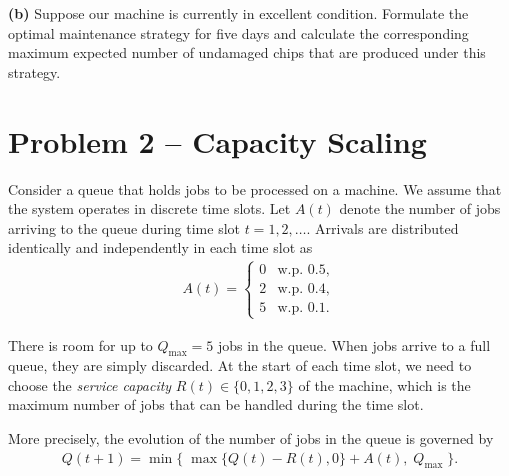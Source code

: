 \documentclass{article}
\begin{document}
\vspace{1em}
\noindent
\textbf{(b)}
Suppose our machine is currently in excellent condition.
Formulate the optimal maintenance strategy for five days and calculate the corresponding maximum expected number of undamaged chips that are produced under this strategy.


\section*{Problem 2 -- Capacity Scaling}

Consider a queue that holds jobs to be processed on a machine.
We assume that the system operates in discrete time slots.
Let $A(t)$ denote the number of jobs arriving to the queue during time slot $t = 1, 2, \dots$.
Arrivals are distributed identically and independently in each time slot as
\begin{align*}
    A(t) = \begin{cases}
        0 & \text{w.p. } 0.5, \\
        2 & \text{w.p. } 0.4, \\
        5 & \text{w.p. } 0.1.
    \end{cases}
\end{align*}


\noindent
There is room for up to $Q_\text{max}=5$ jobs in the queue.
When jobs arrive to a full queue, they are simply discarded.
At the start of each time slot, we need to choose the \textit{service capacity} $R(t) \in \{ 0, 1, 2, 3 \}$ of the machine, which is the maximum number of jobs that can be handled during the time slot.

\begin{figure}[h!]
    \centering
{}
\label{queue}
\end{figure}
\vspace{0.5em}

\noindent
More precisely, the evolution of the number of jobs in the queue is governed by
\begin{align*}
    Q(t + 1) = \min\{ \; \max \{ Q(t) - R(t), 0 \} + A(t) , \; Q_\text{max} \; \} .
\end{align*}
\end{document}
